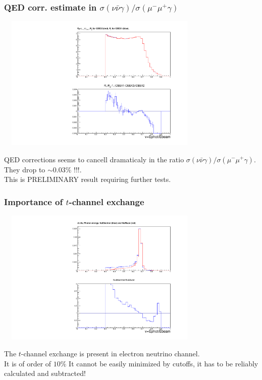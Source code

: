\documentclass{beamer}
\newcommand{\crd}{\color{red}}
\begin{document}
\begin{frame}[fragile]
\frametitle{\LARGE QED corr. estimate in
   $\sigma(\nu\bar\nu\gamma)/\sigma(\mu^-\mu^+\gamma)$}

\vspace{-2mm}
{\includegraphics[width=100mm,height=65mm]{mcCeex21rat.pdf}}

QED corrections seems to cancell dramaticaly in the ratio
$\sigma(\nu\bar\nu\gamma)/\sigma(\mu^-\mu^+\gamma)$.
{\crd They drop to $\sim 0.03\%$ !!!}.\\
This is PRELIMINARY result requiring further tests.

\end{frame}



\begin{frame}[fragile]
\frametitle{\bf Importance of $t$-channel exchange}

\vspace{-2mm}
{\includegraphics[width=100mm,height=65mm]{mcNuDiff.pdf}}

\small
The $t$-channel exchange is present in electron neutrino channel.\\
{\crd It is of order of $10\%$
It cannot be easily minimized by cutoffs, 
it has to be reliably calculated and subtracted!}

\end{frame}
\end{document}

